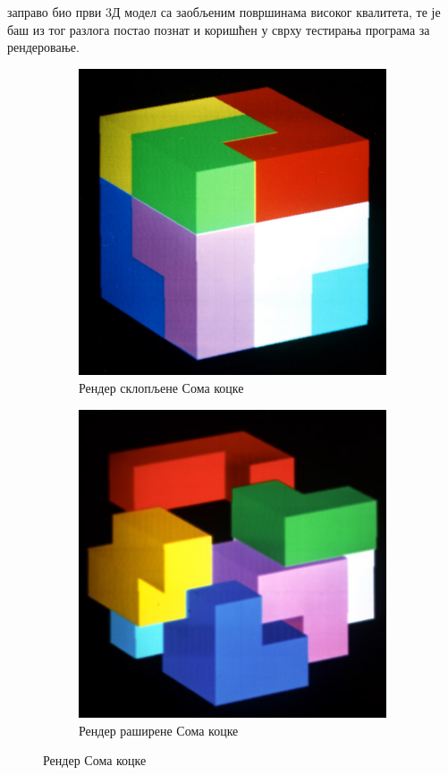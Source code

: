 \documentclass[12pt]{article}
\begin{document}
заправо био први 3Д модел са заобљеним површинама високог квалитета, те је баш из тог разлога постао познат и коришћен у сврху тестирања програма за рендеровање.
	
	\begin{figure}[H]
		\centering
		\begin{subfigure}[b]{0.4\linewidth}
			\includegraphics[width=\linewidth]{slike/prviRenderiRomni1.jpg}
			\caption{Рендер склопљене Сома коцке}
		\end{subfigure}
		\begin{subfigure}[b]{0.4\linewidth}
			\includegraphics[width=\linewidth]{slike/prviRenderiRomni2.jpg}
			\caption{Рендер раширене Сома коцке}
		\end{subfigure}
		\caption{Рендер Сома коцке}
		\label{fig:romni}
	\end{figure}
\end{document}
